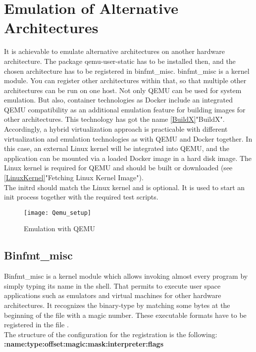\section{Emulation of Alternative Architectures}

It is achievable to emulate alternative architectures on another hardware architecture. The package qemu-user-static has to be installed then, and the chosen architecture has to be registered in binfmt\_misc. binfmt\_misc is a kernel module. 
You can register other architectures within that, so that multiple other architectures can be run on one host. 
Not only QEMU can be used for system emulation. But also, container technologies as Docker include an integrated QEMU compatibility as an additional emulation feature for building images for other architectures. 
This technology has got the name \ref{BuildX}"BuildX". Accordingly, a hybrid virtualization approach is practicable with different virtualization and emulation technologies as with QEMU and Docker together. In this case, an external Linux kernel will be integrated into QEMU, and the application can be mounted via a loaded Docker image in a hard disk image. 
The Linux kernel is required for QEMU and should be built or downloaded (see \ref{LinuxKernel}"Fetching Linux Kernel Image").\\
The initrd should match the Linux kernel and is optional. It is used to start an init process together with the required test scripts. \\

\begin{figure}[H]
\centering
\texttt{[image: Qemu\_setup]}
 \caption{Emulation with QEMU}
    \label{QEMU_Emulation}
\end{figure}


\newpage
\subsection{Binfmt\_misc}

Binfmt\_misc is a kernel module which allows invoking almost every program by simply typing its name in the shell. That permits to execute user space applications such as emulators and virtual machines for other hardware architectures. It recognizes the binary-type by matching some bytes at the beginning of the file with a magic number. These executable formats have to be registered in the file .\\
The structure of the configuration for the registration is the following: \\ \textbf{:name:type:offset:magic:mask:interpreter:flags} 


